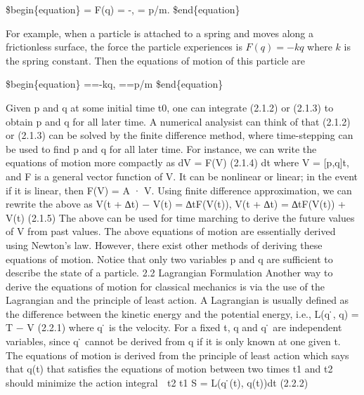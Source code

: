 \documentclass[
  9pt,
]{extbook}
\begin{document}
\$begin\{equation\}
 = F(q) = -,  = p/m.
\label{eq:class2}
\$end\{equation\}

For example, when a particle is attached to a spring and moves along a frictionless surface, the force the particle experiences is \(F(q) = -kq\) where \(k\) is the spring constant. Then the equations of motion of this particle are

\$begin\{equation\}
 ==-kq,  ==p/m
\label{eq:class2}
\$end\{equation\}

Given p and q at some initial time t0, one can integrate (2.1.2) or (2.1.3) to obtain p and q for all later time. A numerical analysist can think of that (2.1.2) or (2.1.3) can be solved by the finite difference method, where time-stepping can be used to find p and q for all later time. For instance, we can write the equations of motion more compactly as
dV = F(V) (2.1.4) dt
where V = {[}p,q{]}t, and F is a general vector function of V. It can be nonlinear or linear; in the event if it is linear, then F(V) = A · V.
Using finite difference approximation, we can rewrite the above as V(t + ∆t) − V(t) = ∆tF(V(t)),
V(t + ∆t) = ∆tF(V(t)) + V(t) (2.1.5)
The above can be used for time marching to derive the future values of V from past values. The above equations of motion are essentially derived using Newton's law. However, there exist other methods of deriving these equations of motion. Notice that only two variables p
and q are sufficient to describe the state of a particle. 2.2 Lagrangian Formulation
Another way to derive the equations of motion for classical mechanics is via the use of the Lagrangian and the principle of least action. A Lagrangian is usually defined as the difference between the kinetic energy and the potential energy, i.e.,
L(q ̇, q) = T − V (2.2.1)
where q ̇ is the velocity. For a fixed t, q and q ̇ are independent variables, since q ̇ cannot be derived from q if it is only known at one given t. The equations of motion is derived from the principle of least action which says that q(t) that satisfies the equations of motion between two times t1 and t2 should minimize the action integral
􏰟 t2 t1
S =
L(q ̇(t), q(t))dt (2.2.2)
\end{document}
